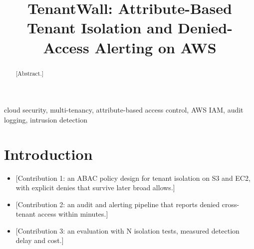 \documentclass[conference]{IEEEtran}
\begin{document}
\title{TenantWall: Attribute-Based Tenant Isolation and Denied-Access Alerting on AWS}

\author{
\and
{}
}

\maketitle

\begin{abstract}
[Abstract.]
\end{abstract}

\begin{IEEEkeywords}
cloud security, multi-tenancy, attribute-based access control, AWS IAM, audit logging, intrusion detection
\end{IEEEkeywords}

\section{Introduction}
\begin{itemize}
\item {}[Contribution 1: an ABAC policy design for tenant isolation on S3 and EC2, with explicit denies that survive later broad allows.]
\item {}[Contribution 2: an audit and alerting pipeline that reports denied cross-tenant access within minutes.]
\item {}[Contribution 3: an evaluation with N isolation tests, measured detection delay and cost.]
\end{itemize}
\end{document}

